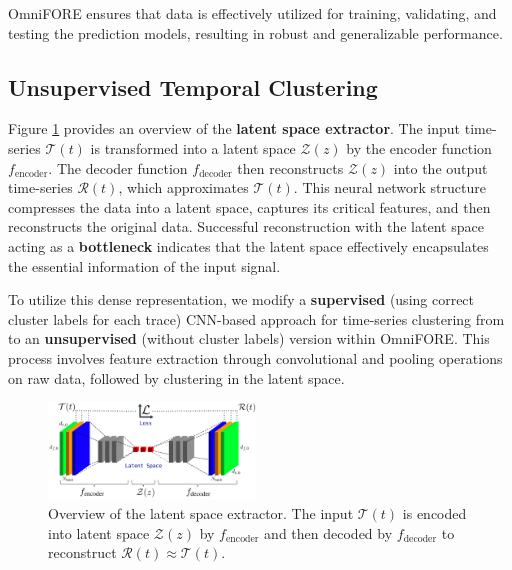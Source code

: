 OmniFORE ensures that data is effectively utilized for training, validating, and testing the prediction models, resulting in robust and generalizable performance.

\subsection{Unsupervised Temporal Clustering}
\label{sec: Unsupervised Temporal Clustering}

Figure \ref{fig:latent_space_creation} provides an overview of the \textbf{latent space extractor}. The input time-series $\mathcal{T}(t)$ is transformed into a latent space $\mathcal{Z}(z)$ by the encoder function $f_{\text{encoder}}$. The decoder function $f_{\text{decoder}}$ then reconstructs $\mathcal{Z}(z)$ into the output time-series $\mathcal{R}(t)$, which approximates $\mathcal{T}(t)$. This neural network structure compresses the data into a latent space, captures its critical features, and then reconstructs the original data. Successful reconstruction with the latent space acting as a \textbf{bottleneck} indicates that the latent space effectively encapsulates the essential information of the input signal.

To utilize this dense representation, we modify a \textbf{supervised} (using correct cluster labels for each trace) CNN-based approach for time-series clustering from \cite{clusteringDL} to an \textbf{unsupervised} (without cluster labels) version within OmniFORE. This process involves feature extraction through convolutional and pooling operations on raw data, followed by clustering in the latent space.


\begin{figure}
\centering
\includegraphics[width=0.49\textwidth]{img/latent_space_creation.png}
\caption{Overview of the latent space extractor. The input $\mathcal{T}(t)$ is encoded into latent space $\mathcal{Z}(z)$ by $f_{\text{encoder}}$ and then decoded by $f_{\text{decoder}}$ to reconstruct $\mathcal{R}(t) \approx \mathcal{T}(t)$.}
\label{fig:latent_space_creation}
\end{figure}

